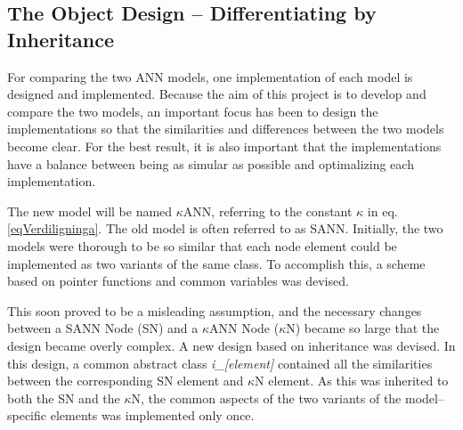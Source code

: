 	\subsection{The Object Design -- Differentiating by Inheritance} %

	For comparing the two ANN models, one implementation of each model is designed and implemented. 
	Because the aim of this project is to develop and compare the two models, an important focus has been to design the implementations so that the similarities and differences between the two models become clear.
	For the best result, it is also important that the implementations have a balance between being as simular as possible and optimalizing each implementation. %

	The new model will be named $\kappa$ANN, referring to the constant $\kappa$ in eq. \eqref{eqVerdiligninga}. The old model is often referred to as SANN.
	Initially, the two models were thorough to be so similar that each node element could be implemented as two variants of the same class.
	To accomplish this, a scheme based on pointer functions and common variables was devised.

	This soon proved to be a misleading assumption, and the necessary changes between a SANN Node (SN) and a $\kappa$ANN Node ($\kappa$N) became so large that the design became overly complex.
	A new design based on inheritance was devised.
	In this design, a common abstract class \emph{i\_[element]} contained all the similarities between the corresponding SN element and $\kappa$N element.
	As this was inherited to both the SN and the $\kappa$N, the common aspects of the two variants of the model--specific elements was implemented only once.

